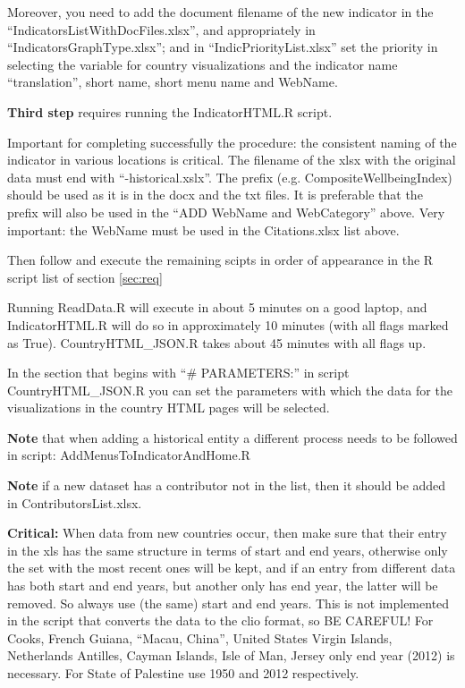 \documentclass[a4paper]{article}
\begin{document}
Moreover, you need to add the document filename of the new indicator in the ``IndicatorsListWithDocFiles.xlsx'', and appropriately in ``IndicatorsGraphType.xlsx''; and in ``IndicPriorityList.xlsx'' set the priority in selecting the variable for country visualizations and the indicator name ``translation'', short name, short menu name and WebName.

\textbf{Third step} requires running the IndicatorHTML.R script. 

Important for completing successfully the procedure: the consistent naming of 
the indicator in various locations is critical. The filename of the xlsx with 
the original data must end with ``-historical.xslx''. The prefix (e.g. 
CompositeWellbeingIndex) should be used as it is in the docx and the txt files. 
It is preferable that the prefix will also be used in the ``ADD WebName and 
WebCategory'' above. Very important: the WebName must be used in the 
Citations.xlsx list above.

Then follow and execute the remaining scipts in order of appearance in the R script list of section \ref{sec:req}

Running ReadData.R will execute in about 5 minutes on a good laptop, and 
IndicatorHTML.R will do so in approximately 10 minutes (with all flags marked 
as True). CountryHTML\_JSON.R takes about 45 minutes with all flags up.

In the section that begins with ``\# PARAMETERS:'' in script CountryHTML\_JSON.R
you can set the parameters with which the data for the visualizations in the 
country HTML pages will be selected.

\textbf{Note} that when adding a historical entity a different process needs to be 
followed in script: AddMenusToIndicatorAndHome.R

\textbf{Note} if a new dataset has a contributor not in the list, then it should be added in ContributorsList.xlsx.

\textbf{Critical:} When data from new countries occur, then make sure that their entry in the xls has the same structure in terms of start and end years, otherwise only the set with the most recent ones will be kept, and if an entry from different data has both start and end years, but another only has end year, the latter will be removed. So always use (the same) start and end years. This is not implemented in the script that converts the data to the clio format, so BE CAREFUL! For Cooks, French Guiana, ``Macau, China'', United States Virgin Islands, Netherlands Antilles, Cayman Islands, Isle of Man, Jersey only end year (2012) is necessary. For State of Palestine use 1950 and 2012 respectively.
\end{document}
